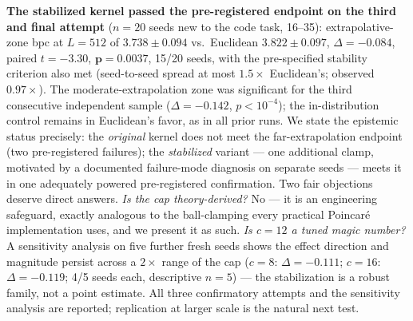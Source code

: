 \documentclass[11pt]{article}
\begin{document}
\textbf{The stabilized kernel passed the pre-registered endpoint on the third and final attempt} ($n{=}20$ seeds new to the code task, 16--35): extrapolative-zone bpc at $L{=}512$ of $3.738 \pm 0.094$ vs.\ Euclidean $3.822 \pm 0.097$, $\Delta = -0.084$, paired $t = -3.30$, $\bm{p = 0.0037}$, 15/20 seeds, with the pre-specified stability criterion also met (seed-to-seed spread at most $1.5\times$ Euclidean's; observed $0.97\times$). The moderate-extrapolation zone was significant for the third consecutive independent sample ($\Delta = -0.142$, $p < 10^{-4}$); the in-distribution control remains in Euclidean's favor, as in all prior runs. We state the epistemic status precisely: the \emph{original} kernel does not meet the far-extrapolation endpoint (two pre-registered failures); the \emph{stabilized} variant --- one additional clamp, motivated by a documented failure-mode diagnosis on separate seeds --- meets it in one adequately powered pre-registered confirmation. Two fair objections deserve direct answers. \emph{Is the cap theory-derived?} No --- it is an engineering safeguard, exactly analogous to the ball-clamping every practical Poincar\'e implementation uses, and we present it as such. \emph{Is $c = 12$ a tuned magic number?} A sensitivity analysis on five further fresh seeds shows the effect direction and magnitude persist across a $2\times$ range of the cap ($c = 8$: $\Delta = -0.111$; $c = 16$: $\Delta = -0.119$; 4/5 seeds each, descriptive $n=5$) --- the stabilization is a robust family, not a point estimate. All three confirmatory attempts and the sensitivity analysis are reported; replication at larger scale is the natural next test.
\end{document}
